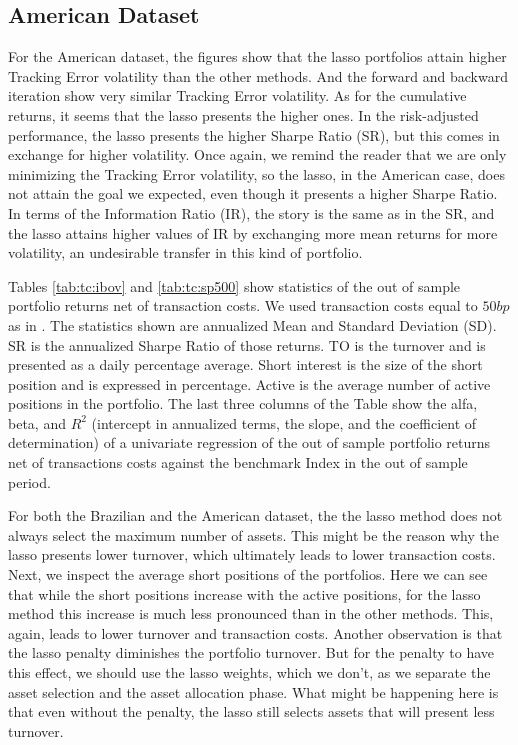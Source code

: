 \documentclass[12pt,oneside,a4paper]{memoir}
\begin{document}
\subsection*{American Dataset} 

For the American dataset, the figures show that the lasso portfolios attain higher Tracking Error volatility than the other methods.
And the forward and backward iteration show very similar Tracking Error volatility.
As for the cumulative returns, it seems that the lasso presents the higher ones.
In the risk-adjusted performance, the lasso presents the higher Sharpe Ratio (SR), but this comes in exchange for higher volatility.
Once again, we remind the reader that we are only minimizing the Tracking Error volatility, so the lasso, in the American case, does not attain the goal we expected, even though it presents a higher Sharpe Ratio.
In terms of the Information Ratio (IR), the story is the same as in the SR, and the lasso attains higher values of IR by exchanging more mean returns for more volatility, an undesirable transfer in this kind of portfolio.

Tables \ref{tab:tc:ibov} and \ref{tab:tc:sp500} show statistics of the out of sample portfolio returns net of transaction costs.
We used transaction costs equal to $50bp$ as in .
The statistics shown are annualized Mean and Standard Deviation (SD).
SR is the annualized Sharpe Ratio of those returns.
TO is the turnover and is presented as a daily percentage average.
Short interest is the size of the short position and is expressed in percentage.
Active is the average number of active positions in the portfolio.
The last three columns of the Table show the alfa, beta, and $R^2$ (intercept in annualized terms, the slope, and the coefficient of determination) of a univariate regression of the out of sample portfolio returns net of transactions costs against the benchmark Index in the out of sample period.

For both the Brazilian and the American dataset, the the lasso method does not always select the maximum number of assets.
This might be the reason why the lasso presents lower turnover, which ultimately leads to lower transaction costs.
Next, we inspect the average short positions of the portfolios.
Here we can see that while the short positions increase with the active positions, for the lasso method this increase is much less pronounced than in the other methods.
This, again, leads to lower turnover and transaction costs.
Another observation is that the lasso penalty diminishes the portfolio turnover.
But for the penalty to have this effect, we should use the lasso weights, which we don't, as we separate the asset selection and the asset allocation phase.
What might be happening here is that even without the penalty, the lasso still selects assets that will present less turnover.
\end{document}

